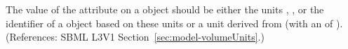 The value of the attribute  on a \Model object should be
either the units , , or the identifier of a
\UnitDefinition object based on these units or a unit derived from
 (with an  of ).  (References: SBML L3V1
Section~\ref{sec:model-volumeUnits}.)
